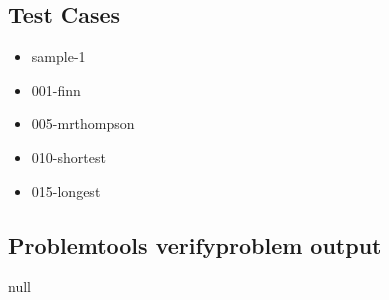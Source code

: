 \documentclass{article}%
\begin{document}
\subsection{Test Cases}%
\label{subsec:TestCases}%
\begin{itemize}%
\item%
sample{-}1%
\item%
001{-}finn%
%
\item%
005{-}mrthompson%
%
\item%
010{-}shortest%
\item%
015{-}longest%
\end{itemize}

%
\subsection{Problemtools verifyproblem output}%
\label{subsec:Problemtoolsverifyproblemoutput}%
null

%
\end{document}
